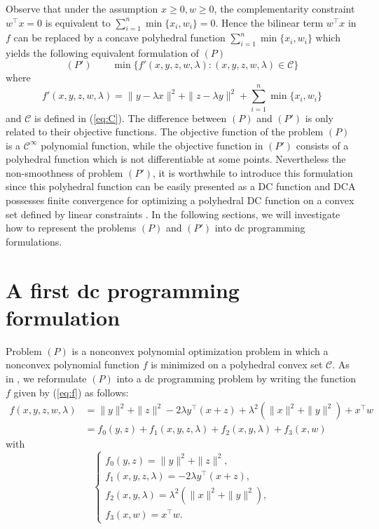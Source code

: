 \documentclass[3p]{elsarticle}
\begin{document}
Observe that under the assumption $x\geq 0, w\geq 0$, the complementarity constraint $w^{\top}x=0$ is equivalent to $\sum_{i=1}^{n} \min\{x_i,w_i\} = 0$. Hence the bilinear term $w^{\top}x$ in $f$ can be replaced by a concave polyhedral function $\sum_{i=1}^{n} \min\{x_i,w_i\}$ which yields the following equivalent formulation of $(P)$ 
\begin{equation}\label{prob:nlp'}
(P') \qquad 
\min \{ f'(x,y,z,w,\lambda) : (x,y,z,w,\lambda)\in \mathcal{C} \}\nonumber
\end{equation}
where \begin{equation}
f'(x,y,z,w,\lambda)= \|y-\lambda x\|^2 + \|z-\lambda y\|^2 + \sum_{i=1}^{n} \min\{x_i,w_i\}
\end{equation} and $\mathcal{C}$ is defined in (\ref{eq:C}).
The difference between $(P)$ and $(P')$ is only related to their objective functions. The objective function of the problem $(P)$ is a $\mathcal{C}^{\infty}$ polynomial function, while the objective function in $(P')$ consists of a polyhedral function which is not differentiable at some points. Nevertheless the non-smoothness of problem $(P')$, it is worthwhile to introduce this formulation since this polyhedral function can be easily presented as a DC function and DCA possesses finite convergence for optimizing a polyhedral DC function on a convex set defined by linear constraints \cite{Pham02}. In the following sections, we will investigate how to represent the problems $(P)$ and $(P')$ into dc programming formulations.

\section{A first dc programming formulation}\label{sec:dcpofP}
Problem $(P)$ is a nonconvex polynomial optimization problem in which a nonconvex polynomial function $f$ is minimized on a polyhedral convex set $\mathcal{C}$. As in \cite{Niu15}, we reformulate $(P)$ into a dc programming problem by writing the function $f$ given by (\ref{eq:f}) as follows:
\begin{align}\label{eq:df}
f(x,y,z,w,\lambda) & =\|y\|^2 + \|z\|^2 -2\lambda y^{\top}(x+z) + \lambda^2 (\|x\|^2 + \|y\|^2) + x^{\top}w \\
& =f_0(y,z) + f_1(x,y,z,\lambda) + f_2(x,y,\lambda) + f_3(x,w) \nonumber
\end{align}
with 
\begin{equation}\label{eq:f0-f3}
\left\{\begin{array}{l}
f_0(y,z)=\|y\|^2 + \|z\|^2,\\
f_1(x,y,z,\lambda)=-2\lambda y^{\top}(x+z),\\
f_2(x,y,\lambda)= \lambda^2 (\|x\|^2 + \|y\|^2),\\ 
f_3(x,w)= x^{\top}w.
\end{array}
\right.
\end{equation}
\end{document}
